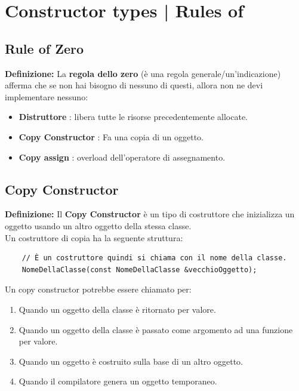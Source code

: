 

\section{Constructor types | Rules of}

\subsection{Rule of Zero}

\textsf{\small \textbf{Definizione: } La \textbf{regola dello zero} (è una regola generale/un'indicazione) afferma che se non hai bisogno di nessuno di questi, allora non ne devi implementare nessuno: } \\

\begin{itemize}
	\item \textsf{\small \textbf{Distruttore} : libera tutte le risorse precedentemente allocate.}
	\item \textsf{\small \textbf{Copy Constructor} : Fa una copia di un oggetto.}
	\item \textsf{\small \textbf{Copy assign} : overload dell'operatore di assegnamento.}
\end{itemize}

\subsection{Copy Constructor}

\textsf{\small \textbf{Definizione: } Il \textbf{Copy Constructor} è un tipo di costruttore che inizializza un oggetto usando un altro oggetto della stessa classe.} \\

\textsf{\small Un costruttore di copia ha la seguente struttura: } \\

\begin{lstlisting}
	// È un costruttore quindi si chiama con il nome della classe.
	NomeDellaClasse(const NomeDellaClasse &vecchioOggetto);
\end{lstlisting}

\textsf{\small Un copy constructor potrebbe essere chiamato per:}

\begin{enumerate}
	\item \textsf{\small Quando un oggetto della classe è ritornato per valore.}
	\item \textsf{\small Quando un oggetto della classe è passato come argomento ad una funzione per valore.}
	\item \textsf{\small Quando un oggetto è costruito sulla base di un altro oggetto.}
	\item \textsf{\small Quando il compilatore genera un oggetto temporaneo.}
\end{enumerate}

